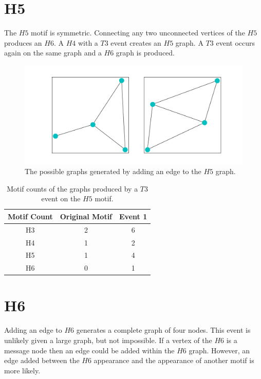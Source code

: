 \section{H5}
The $H5$ motif is symmetric. Connecting any two unconnected vertices of the $H5$ produces an $H6$.
A $H4$ with a $T3$ event creates an $H5$ graph. A $T3$ event occurs again on the same graph and a $H6$
graph is produced.

\begin{figure}[!ht]
    \includegraphics[width=14cm]{Images/H5_T3_evolution.png}
    \centering
    \caption{The possible graphs generated by adding an edge to the $H5$ graph.}
\end{figure}

\begin{table}
    \centering
    \begin{tabular}{||c c c||} 
    \hline
    Motif Count & Original Motif & Event 1 \\ [0.5ex] 
    \hline\hline
    H3 & 2 & 6\\ 
    \hline
    H4 & 1 & 2 \\
    \hline
    H5 & 1 & 4\\
    \hline
    H6 & 0 & 1\\
    \hline
   \end{tabular}
   \caption{Motif counts of the graphs produced by a $T3$ event on the $H5$ motif.}
   \label{table:14}
\end{table}

\section{H6}
Adding an edge to $H6$ generates a complete graph of four nodes. This 
event is unlikely given a large graph, but not impossible. If a vertex
of the $H6$ is a message node then an edge could be added within the $H6$ graph. 
However, an edge added between the $H6$ appearance and the appearance of another 
motif is more likely. 


